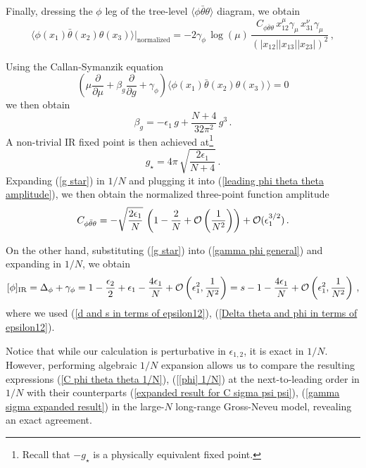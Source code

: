 \documentclass[aps,amsmath,amssymb,prd,showpacs,floatfix,preprint,superscriptaddress,nofootinbib,12pt]{article}
\begin{document}
Finally, dressing the $\phi$ leg of the tree-level $\langle \phi\bar\theta\theta\rangle$ diagram, we obtain 
\begin{equation}
\langle \phi (x_1)\bar\theta(x_2)\theta (x_3)\rangle\Bigg|_{\textrm{normalized}}
=-2\gamma_\phi\,\log(\mu)\,\frac{C_{\phi\bar\theta\theta}\,x_{12}^\mu\gamma_\mu\,x_{31}^\nu\gamma_\mu}
{(|x_{12}||x_{13}||x_{23}|)^2}\,,
\end{equation}

Using the Callan-Symanzik equation
\begin{equation}
\left(\mu\frac{\partial}{\partial\mu} + \beta_g\frac{\partial}{\partial g} + \gamma_\phi\right) \langle
 \phi (x_1)\bar\theta(x_2)\theta (x_3)\rangle = 0
\end{equation}
we then obtain
\begin{equation}
\beta_g = -\epsilon_1\,g +\frac{N+4}{32\pi^2}\,g^3\,.
\end{equation}
A non-trivial IR fixed point is then achieved at\footnote{Recall that $-g_\star$ is a physically equivalent fixed point.}
\begin{equation}
\label{g star}
g_\star = 4\pi\,\sqrt{\frac{2\epsilon_1}{N+4}}\,.
\end{equation}
Expanding (\ref{g star}) in $1/N$ and plugging it into
 (\ref{leading phi theta theta amplitude}), we then obtain the normalized three-point
function amplitude 
\begin{equation}
\label{C phi theta theta 1/N}
C_{\phi\bar\theta\theta} = -\sqrt{\frac{2\epsilon_1}{N}}\,
\left(1-\frac{2}{N}+{\cal O}\left(\frac{1}{N^2}\right)\right) + {\cal O}(\epsilon_1^{3/2})\,.
\end{equation}


On the other hand, substituting (\ref{g star})
into (\ref{gamma phi general}) and expanding in $1/N$, we obtain
\begin{equation}
\label{[phi] 1/N}
[\phi] _{\textrm{IR}} = \Delta_\phi + \gamma_\phi = 1-\frac{\epsilon_2}{2} + \epsilon_1 - \frac{4\epsilon_1}{N}
+{\cal O}\left(\epsilon_1^2,\frac{1}{N^2}\right)
=s-1 - \frac{4\epsilon_1}{N} +{\cal O}\left(\epsilon_1^2,\frac{1}{N^2}\right)\,,
\end{equation}
where we used (\ref{d and s in terms of epsilon12}), (\ref{Delta theta and phi in terms of epsilon12}).

Notice that while our calculation is perturbative in $\epsilon_{1,2}$, it is exact in $1/N$.
However, performing algebraic $1/N$ expansion allows us to compare the resulting
expressions (\ref{C phi theta theta 1/N}), (\ref{[phi] 1/N})
at the next-to-leading order in $1/N$ with their counterparts (\ref{expanded result for C sigma psi psi}),
(\ref{gamma sigma expanded result})
in the large-$N$ long-range Gross-Neveu model, revealing an exact agreement.
\end{document}
